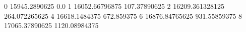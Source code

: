 0 15945.2890625 0.0
1 16052.66796875 107.37890625
2 16209.361328125 264.072265625
4 16618.1484375 672.859375
6 16876.84765625 931.55859375
8 17065.37890625 1120.08984375
